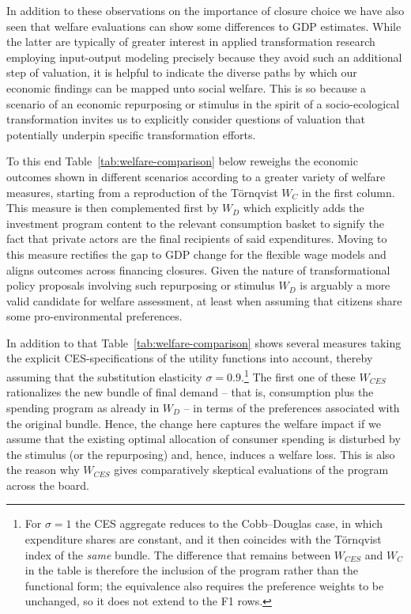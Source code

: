 In addition to these observations on the importance of closure choice we have also seen that welfare evaluations can show some differences to GDP estimates. While the latter are typically of greater interest in applied transformation research employing input-output modeling precisely because they avoid such an additional step of valuation, it is helpful to indicate the diverse paths by which our economic findings can be mapped unto social welfare. This is so because a scenario of an economic repurposing or stimulus in the spirit of a socio-ecological transformation invites us to explicitly consider questions of valuation that potentially underpin specific transformation efforts.

To this end Table~\ref{tab:welfare-comparison} below reweighs the economic outcomes shown in different scenarios according to a greater variety of welfare measures, starting from a reproduction of the T\"ornqvist $W_C$ in the first column. This measure is then complemented first by $W_D$ which explicitly adds the investment program content to the relevant consumption basket to signify the fact that private actors are the final recipients of said expenditures. Moving to this measure rectifies the gap to GDP change for the flexible wage models and aligns outcomes across financing closures. Given the nature of transformational policy proposals involving such repurposing or stimulus $W_D$ is arguably a more valid candidate for welfare assessment, at least when assuming that citizens share some pro-environmental preferences.

In addition to that Table~\ref{tab:welfare-comparison} shows several measures taking the explicit CES-specifications of the utility functions into account, thereby assuming that the substitution elasticity $\sigma=0.9$.\footnote{For $\sigma=1$ the CES aggregate reduces to the Cobb--Douglas case, in which expenditure shares are constant, and it then coincides with the T\"ornqvist index of the \emph{same} bundle. The difference that remains between $W_{CES}$ and $W_C$ in the table is therefore the inclusion of the program rather than the functional form; the equivalence also requires the preference weights to be unchanged, so it does not extend to the F1 rows.} The first one of these $W_{CES}$ rationalizes the new bundle of final demand -- that is, consumption plus the spending program as already in $W_D$ -- in terms of the preferences associated with the original bundle. Hence, the change here captures the welfare impact if we assume that the existing optimal allocation of consumer spending is disturbed by the stimulus (or the repurposing) and, hence, induces a welfare loss. This is also the reason why $W_{CES}$ gives comparatively skeptical evaluations of the program across the board.

